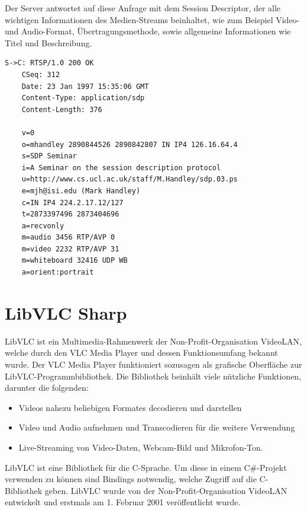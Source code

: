 Der Server antwortet auf diese Anfrage mit dem Session Descriptor, der alle wichtigen Informationen des Medien-Streams beinhaltet, wie zum Beispiel Video- und Audio-Format, Übertragungsmethode, sowie allgemeine Informationen wie Titel und Beschreibung.
\begin{lstlisting}
S->C: RTSP/1.0 200 OK
    CSeq: 312
    Date: 23 Jan 1997 15:35:06 GMT
    Content-Type: application/sdp
    Content-Length: 376

    v=0
    o=mhandley 2890844526 2890842807 IN IP4 126.16.64.4
    s=SDP Seminar
    i=A Seminar on the session description protocol
    u=http://www.cs.ucl.ac.uk/staff/M.Handley/sdp.03.ps
    e=mjh@isi.edu (Mark Handley)
    c=IN IP4 224.2.17.12/127
    t=2873397496 2873404696
    a=recvonly
    m=audio 3456 RTP/AVP 0
    m=video 2232 RTP/AVP 31
    m=whiteboard 32416 UDP WB
    a=orient:portrait
\end{lstlisting}

\section{LibVLC Sharp}

LibVLC ist ein Multimedia-Rahmenwerk der Non-Profit-Organisation VideoLAN, welche durch den VLC Media Player und dessen Funktionsumfang bekannt wurde. Der VLC Media Player funktioniert sozusagen als grafische Oberfläche zur LibVLC-Programmbibliothek.
Die Bibliothek beinhält viele nützliche Funktionen, darunter die folgenden:
\begin{itemize}
    \item Videos nahezu beliebigen Formates decodieren und darstellen
    \item Video und Audio aufnehmen und Transcodieren für die weitere Verwendung
    \item Live-Streaming von Video-Daten, Webcam-Bild und Mikrofon-Ton.
\end{itemize}    
LibVLC ist eine Bibliothek für die C-Sprache. Um diese in einem C\#-Projekt verwenden zu können sind Bindings notwendig, welche Zugriff auf die C-Bibliothek geben.
LibVLC wurde von der Non-Profit-Organisation VideoLAN entwickelt und erstmals am 1. Februar 2001 veröffentlicht wurde.\cite{libvlc-release}\par

